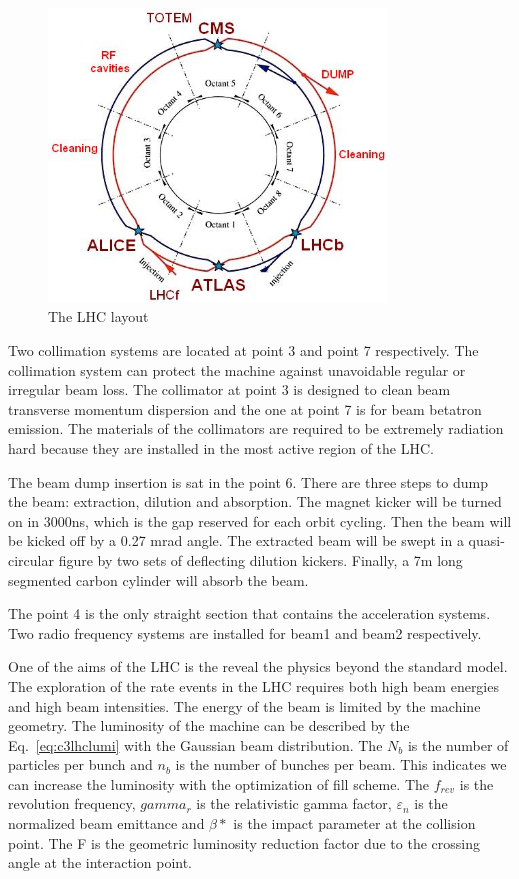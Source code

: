 \begin{figure}[htbp]
 \begin{center}
  \includegraphics[width=0.8\textwidth]{figures/c3/c3_lhc_latticelayout.jpg}
 \end{center}
 \caption{The LHC layout}
 \label{fig:c3lhclayout}
\end{figure}

Two collimation systems are located at point 3 and point 7 respectively. The collimation system can protect the machine against unavoidable regular or irregular beam loss. The collimator at point 3 is designed to clean beam transverse momentum dispersion and the one at point 7 is for beam betatron emission. The materials of the collimators are required to be extremely radiation hard because they are installed in the most active region of the LHC. 

The beam dump insertion is sat in the point 6. There are three steps to dump the beam: extraction, dilution and absorption. The magnet kicker will be turned on in 3000ns, which is the gap reserved for each orbit cycling. Then the beam will be kicked off by a 0.27 mrad angle. The extracted beam will be swept in a quasi-circular figure by two sets of deflecting dilution kickers. Finally, a 7m long segmented carbon cylinder will absorb the beam.

The point 4 is the only straight section that contains the acceleration systems. Two radio frequency systems are installed for beam1 and beam2 respectively. 

One of the aims of the LHC is the reveal the physics beyond the standard model. The exploration of the rate events in the LHC requires both high beam energies and high beam intensities. The energy of the beam is limited by the machine geometry. The luminosity of the machine can be described by the Eq.~\ref{eq:c3lhclumi} with the Gaussian beam distribution. The $N_{b}$ is the number of particles per bunch and $n_{b}$ is the number of bunches per beam. This indicates we can increase the luminosity with the optimization of fill scheme. The $f_{rev}$ is the revolution frequency, $gamma_{r}$ is the relativistic gamma factor, $\varepsilon_{n}$ is the normalized beam emittance and $\beta *$ is the impact parameter at the collision point. The F is the geometric luminosity reduction factor due to the crossing angle at the interaction point. 


